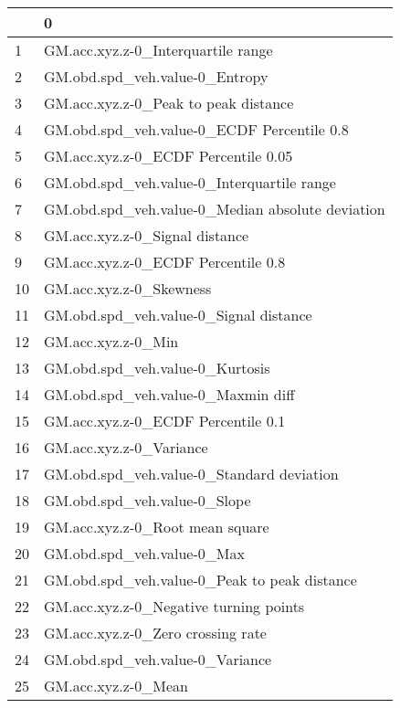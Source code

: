 \begin{tabular}{ll}
\toprule
{} &                                                 0 \\
\midrule
1  &                GM.acc.xyz.z-0\_Interquartile range \\
2  &                    GM.obd.spd\_veh.value-0\_Entropy \\
3  &              GM.acc.xyz.z-0\_Peak to peak distance \\
4  &        GM.obd.spd\_veh.value-0\_ECDF Percentile 0.8 \\
5  &               GM.acc.xyz.z-0\_ECDF Percentile 0.05 \\
6  &        GM.obd.spd\_veh.value-0\_Interquartile range \\
7  &  GM.obd.spd\_veh.value-0\_Median absolute deviation \\
8  &                    GM.acc.xyz.z-0\_Signal distance \\
9  &                GM.acc.xyz.z-0\_ECDF Percentile 0.8 \\
10 &                           GM.acc.xyz.z-0\_Skewness \\
11 &            GM.obd.spd\_veh.value-0\_Signal distance \\
12 &                                GM.acc.xyz.z-0\_Min \\
13 &                   GM.obd.spd\_veh.value-0\_Kurtosis \\
14 &                GM.obd.spd\_veh.value-0\_Maxmin diff \\
15 &                GM.acc.xyz.z-0\_ECDF Percentile 0.1 \\
16 &                           GM.acc.xyz.z-0\_Variance \\
17 &         GM.obd.spd\_veh.value-0\_Standard deviation \\
18 &                      GM.obd.spd\_veh.value-0\_Slope \\
19 &                   GM.acc.xyz.z-0\_Root mean square \\
20 &                        GM.obd.spd\_veh.value-0\_Max \\
21 &      GM.obd.spd\_veh.value-0\_Peak to peak distance \\
22 &            GM.acc.xyz.z-0\_Negative turning points \\
23 &                 GM.acc.xyz.z-0\_Zero crossing rate \\
24 &                   GM.obd.spd\_veh.value-0\_Variance \\
25 &                               GM.acc.xyz.z-0\_Mean \\

\end{tabular}
